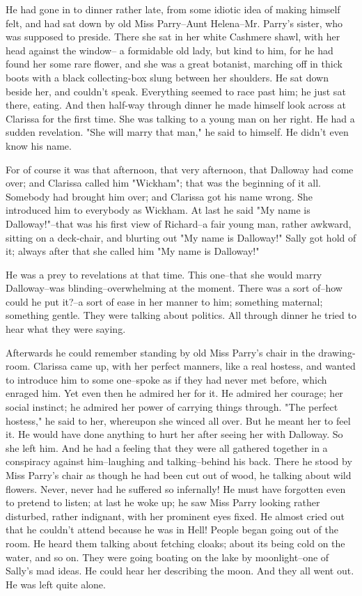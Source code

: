 \documentclass[lang=cn,10pt]{elegantbook}
\begin{document}
He had gone in to dinner rather late, from some idiotic idea of
making himself felt, and had sat down by old Miss Parry--Aunt
Helena--Mr. Parry's sister, who was supposed to preside.  There she
sat in her white Cashmere shawl, with her head against the window--
a formidable old lady, but kind to him, for he had found her some
rare flower, and she was a great botanist, marching off in thick
boots with a black collecting-box slung between her shoulders.  He
sat down beside her, and couldn't speak.  Everything seemed to race
past him; he just sat there, eating.  And then half-way through
dinner he made himself look across at Clarissa for the first time.
She was talking to a young man on her right.  He had a sudden
revelation.  "She will marry that man," he said to himself.  He
didn't even know his name.

For of course it was that afternoon, that very afternoon, that
Dalloway had come over; and Clarissa called him "Wickham"; that was
the beginning of it all.  Somebody had brought him over; and
Clarissa got his name wrong.  She introduced him to everybody as
Wickham.  At last he said "My name is Dalloway!"--that was his
first view of Richard--a fair young man, rather awkward, sitting on
a deck-chair, and blurting out "My name is Dalloway!"  Sally got
hold of it; always after that she called him "My name is Dalloway!"

He was a prey to revelations at that time.  This one--that she
would marry Dalloway--was blinding--overwhelming at the moment.
There was a sort of--how could he put it?--a sort of ease in her
manner to him; something maternal; something gentle.  They were
talking about politics.  All through dinner he tried to hear what
they were saying.

Afterwards he could remember standing by old Miss Parry's chair in
the drawing-room.  Clarissa came up, with her perfect manners, like
a real hostess, and wanted to introduce him to some one--spoke as
if they had never met before, which enraged him.  Yet even then he
admired her for it.  He admired her courage; her social instinct;
he admired her power of carrying things through.  "The perfect
hostess," he said to her, whereupon she winced all over.  But he
meant her to feel it.  He would have done anything to hurt her
after seeing her with Dalloway.  So she left him.  And he had a
feeling that they were all gathered together in a conspiracy
against him--laughing and talking--behind his back.  There he stood
by Miss Parry's chair as though he had been cut out of wood, he
talking about wild flowers.  Never, never had he suffered so
infernally!  He must have forgotten even to pretend to listen; at
last he woke up; he saw Miss Parry looking rather disturbed, rather
indignant, with her prominent eyes fixed.  He almost cried out that
he couldn't attend because he was in Hell!  People began going out
of the room.  He heard them talking about fetching cloaks; about
its being cold on the water, and so on.  They were going boating on
the lake by moonlight--one of Sally's mad ideas.  He could hear her
describing the moon.  And they all went out.  He was left quite
alone.
\end{document}
